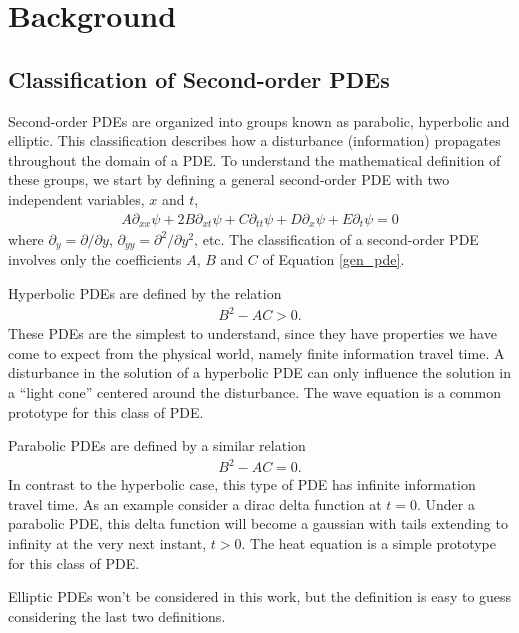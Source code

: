 \documentclass[iop]{emulateapj}
\begin{document}
	
	
	\section{Background}
		\subsection{Classification of Second-order PDEs}
			Second-order PDEs are organized into groups known as parabolic, hyperbolic and elliptic.
				This classification describes how a disturbance (information) propagates throughout the domain of a \ac{PDE}.
				To understand the mathematical definition of these groups, we start by defining a general second-order \ac{PDE} with two independent variables, $x$ and $t$,
				\begin{align}
					A \partial_{xx} \psi + 2 B \partial_{xt} \psi + C \partial_{tt} \psi + D \partial_x \psi + E \partial_t \psi = 0 \label{gen_pde}
				\end{align}
				where $\partial_y = \partial / \partial y$, $\partial_{yy} = \partial^2 / \partial y^2$, etc.
				The classification of a second-order \ac{PDE} involves only the coefficients $A$, $B$ and $C$ of Equation \ref{gen_pde}.
				
			Hyperbolic \acp{PDE} are defined by the relation 
				\begin{align}
					B^2 - AC > 0.
				\end{align}
				These PDEs are the simplest to understand, since they have properties we have come to expect from the physical world, namely finite information travel time.
				A disturbance in the solution of a hyperbolic PDE can only influence the solution in a ``light cone'' centered around the disturbance.
				The wave equation is a common prototype for this class of PDE.
				
			Parabolic \acp{PDE} are defined by a similar relation
				\begin{align}
					B^2 - AC = 0.
				\end{align}
				In contrast to the hyperbolic case, this type of PDE has infinite information travel time.
				As an example consider a dirac delta function at $t=0$. 
				Under a parabolic PDE, this delta function will become a gaussian with tails extending to infinity at the very next instant, $t>0$.
				The heat equation is a simple prototype for this class of PDE.
				
			Elliptic \acp{PDE} won't be considered in this work, but the definition is easy to guess considering the last two definitions.
				
\end{document}
